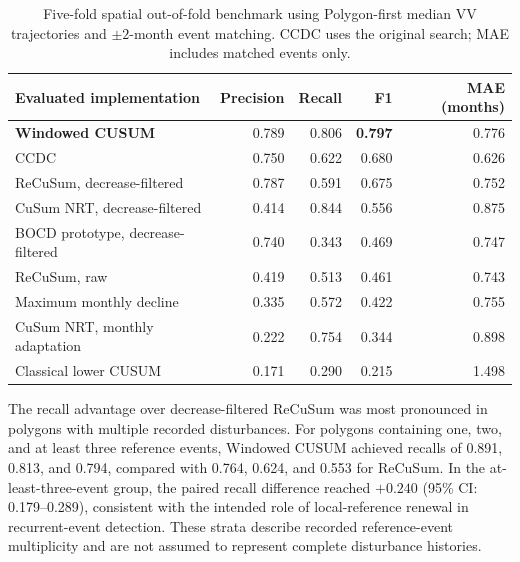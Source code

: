 \begin{table}[pos=!htbp]
    \centering
    \small
    \caption{Five-fold spatial out-of-fold benchmark using Polygon-first median VV trajectories and $\pm2$-month event matching. CCDC uses the original search; MAE includes matched events only.
    }
    \label{tab:benchmark_comparison}

    \begin{tabular}{lrrrr}
        \toprule
        Evaluated implementation & Precision & Recall & F1 & MAE (months) \\
        \midrule
        \textbf{Windowed CUSUM}
        & 0.789 & 0.806 & \textbf{0.797} & 0.776 \\

        CCDC 
        & 0.750 & 0.622 & 0.680 & 0.626 \\

        ReCuSum, decrease-filtered
        & 0.787 & 0.591 & 0.675 & 0.752 \\

        CuSum NRT, decrease-filtered
        & 0.414 & 0.844 & 0.556 & 0.875 \\

        BOCD prototype, decrease-filtered
        & 0.740 & 0.343 & 0.469 & 0.747 \\

        ReCuSum, raw
        & 0.419 & 0.513 & 0.461 & 0.743 \\

        Maximum monthly decline
        & 0.335 & 0.572 & 0.422 & 0.755 \\

        CuSum NRT, monthly adaptation
        & 0.222 & 0.754 & 0.344 & 0.898 \\

        Classical lower CUSUM
        & 0.171 & 0.290 & 0.215 & 1.498 \\
        \bottomrule
    \end{tabular}
\end{table}

The recall advantage over decrease-filtered ReCuSum was most pronounced in polygons with multiple recorded disturbances. For polygons containing one, two, and at least three reference events, Windowed CUSUM achieved recalls of 0.891, 0.813, and 0.794, compared with 0.764, 0.624, and 0.553 for ReCuSum. In the at-least-three-event group, the paired recall difference reached $+0.240$ (95\% CI: 0.179--0.289), consistent with the intended role of local-reference renewal in recurrent-event detection. These strata describe recorded reference-event multiplicity and are not assumed to represent complete disturbance histories.

